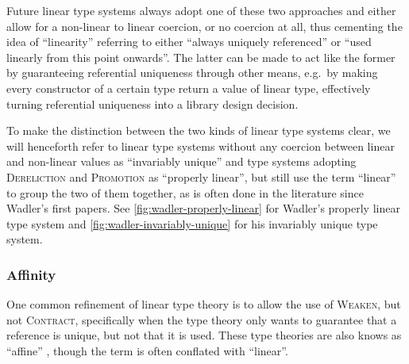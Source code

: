 Future linear type systems \citep{odersky_observers_1992} \citep{atkey_syntax_2018} \citep{bernardy_linear_2018} \citep{brady_idris_2021} \citep{choudhury_graded_2021} \citep{li_linear_2022} \citep{spiwack_linearly_2022} always adopt one of these two approaches and either allow for a non-linear to linear coercion, or no coercion at all, thus cementing the idea of ``linearity'' referring to either ``always uniquely referenced'' or ``used linearly from this point onwards''. The latter can be made to act like the former by guaranteeing referential uniqueness through other means, e.g.\ by making every constructor of a certain type return a value of linear type, effectively turning referential uniqueness into a library design decision.

To make the distinction between the two kinds of linear type systems clear, we will henceforth refer to linear type systems without any coercion between linear and non-linear values as ``invariably unique'' and type systems adopting \textsc{Dereliction} and \textsc{Promotion} as ``properly linear'', but still use the term ``linear'' to group the two of them together, as is often done in the literature since Wadler's first papers. See \cref{fig:wadler-properly-linear} for Wadler's properly linear type system and \cref{fig:wadler-invariably-unique} for his invariably unique type system.

\subsubsection{Affinity}
One common refinement of linear type theory is to allow the use of \textsc{Weaken}, but not \textsc{Contract}, specifically when the type theory only wants to guarantee that a reference is unique, but not that it is used. These type theories are also knows as ``affine'' \citep{tov_practical_2011}, though the term is often conflated with ``linear''.

